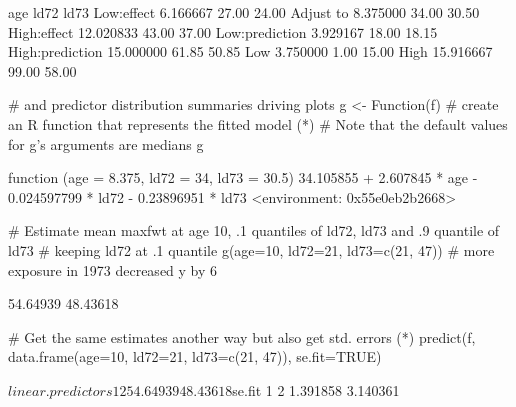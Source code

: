 \begin{Schunk}
\begin{Soutput}
                      age  ld72  ld73
Low:effect       6.166667 27.00 24.00
Adjust to        8.375000 34.00 30.50
High:effect     12.020833 43.00 37.00
Low:prediction   3.929167 18.00 18.15
High:prediction 15.000000 61.85 50.85
Low              3.750000  1.00 15.00
High            15.916667 99.00 58.00
\end{Soutput}
\begin{Sinput}
                      # and predictor distribution summaries driving plots
g <- Function(f)  # create an R function that represents the fitted model (*\ipacue*)
# Note that the default values for g's arguments are medians
g
\end{Sinput}
\begin{Soutput}
function (age = 8.375, ld72 = 34, ld73 = 30.5) 
{
    34.105855 + 2.607845 * age - 0.024597799 * ld72 - 0.23896951 * 
        ld73
}
<environment: 0x55e0eb2b2668>
\end{Soutput}
\begin{Sinput}
# Estimate mean maxfwt at age 10, .1 quantiles of ld72, ld73 and .9 quantile of ld73
# keeping ld72 at .1 quantile
g(age=10, ld72=21, ld73=c(21, 47))  # more exposure in 1973 decreased y by 6
\end{Sinput}
\begin{Soutput}
[1] 54.64939 48.43618
\end{Soutput}
\begin{Sinput}
# Get the same estimates another way but also get std. errors (*\ipacue*)
predict(f, data.frame(age=10, ld72=21, ld73=c(21, 47)), se.fit=TRUE)
\end{Sinput}
\begin{Soutput}
$linear.predictors
       1        2 
54.64939 48.43618 

$se.fit
       1        2 
1.391858 3.140361 
\end{Soutput}
\end{Schunk}

